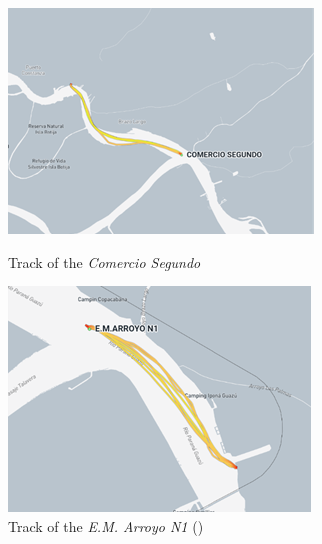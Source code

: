 \begin{figure}[H]
    \centering
    \begin{minipage}{0.48\textwidth}
        \centering
        \includegraphics[width=\linewidth]{figures/ch5/Track_CS.png}
        \caption{Track of the \textit{Comercio Segundo} \autocite{marinetraffic}}
        \label{fig:track_cs}
    \end{minipage}\hfill
    \begin{minipage}{0.48\textwidth}
        \centering
        \includegraphics[width=\linewidth]{figures/ch5/Track_EM.png}
        \caption{Track of the \textit{E.M. Arroyo N1} (\cite{marinetraffic2025})}
        \label{fig:track_em}
    \end{minipage}
\end{figure}

